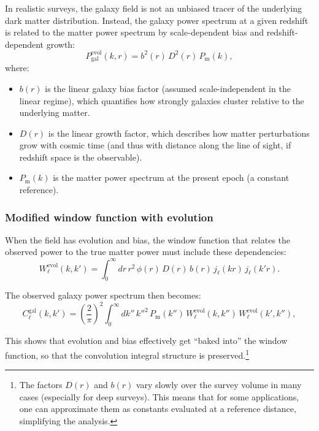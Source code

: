 In realistic surveys, the galaxy field is not an unbiased tracer of the underlying dark matter distribution. Instead,
the galaxy power spectrum at a given redshift is related to the matter power spectrum by scale-dependent bias and
redshift-dependent growth:
\begin{equation}
P_{\text{gal}}^{\text{evol}}(k,r) = b^2(r)\,D^2(r)\,P_{\text{m}}(k),
\label{eq:evolving_biased_power}
\end{equation}
where:
\begin{itemize}
\item $b(r)$ is the linear galaxy bias factor (assumed scale-independent in the linear regime), which quantifies how
strongly galaxies cluster relative to the underlying matter.
\item $D(r)$ is the linear growth factor, which describes how matter perturbations grow with cosmic time (and thus
with distance along the line of sight, if redshift space is the observable).
\item $P_{\text{m}}(k)$ is the matter power spectrum at the present epoch (a constant reference).
\end{itemize}

\subsubsection{Modified window function with evolution}

When the field has evolution and bias, the window function that relates the observed power to the true matter
power must include these dependencies:
\begin{equation}
W^{\text{evol}}_\ell(k,k') = \int_0^\infty dr\,r^2\,\phi(r)\,D(r)\,b(r)\,j_\ell(kr)\,j_\ell(k'r).
\label{eq:window_evolved}
\end{equation}

The observed galaxy power spectrum then becomes:
\begin{equation}
C^{\text{gal}}_\ell(k,k') = \left(\frac{2}{\pi}\right)^2
\int_0^\infty dk''\,k''^2\,P_{\text{m}}(k'')\,W^{\text{evol}}_\ell(k,k'')\,W^{\text{evol}}_\ell(k',k''),
\label{eq:observed_galaxy_power}
\end{equation}

This shows that evolution and bias effectively get ``baked into'' the window function, so that the convolution integral
structure is preserved.\footnote{The factors $D(r)$ and $b(r)$ vary slowly over the survey volume in many cases (especially
for deep surveys). This means that for some applications, one can approximate them as constants evaluated at a
reference distance, simplifying the analysis.}

